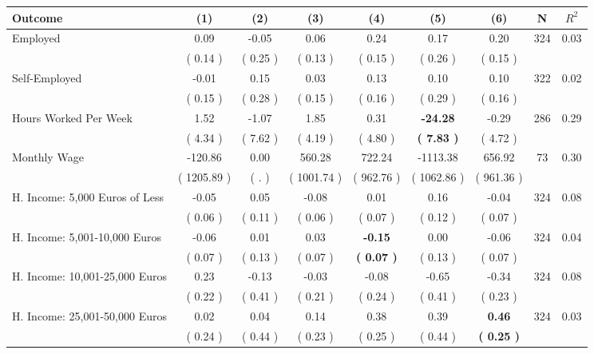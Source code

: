 \begin{tabular}{lcccccccc}
\toprule
 \textbf{Outcome} & \textbf{(1)} & \textbf{(2)} & \textbf{(3)} & \textbf{(4)} & \textbf{(5)} & \textbf{(6)} & \textbf{N} & \textbf{$ R^2$} \\
\midrule
Employed &      0.09 &     -0.05 &      0.06 &      0.24 &      0.17 &      0.20 & 324 &       0.03 \\ 
 & (     0.14 ) & (     0.25 ) & (     0.13 ) & (     0.15 ) & (     0.26 ) & (     0.15 ) & \\
Self-Employed &     -0.01 &      0.15 &      0.03 &      0.13 &      0.10 &      0.10 & 322 &       0.02 \\ 
 & (     0.15 ) & (     0.28 ) & (     0.15 ) & (     0.16 ) & (     0.29 ) & (     0.16 ) & \\
Hours Worked Per Week &      1.52 &     -1.07 &      1.85 &      0.31 & \textbf{   -24.28} &     -0.29 & 286 &       0.29 \\ 
 & (     4.34 ) & (     7.62 ) & (     4.19 ) & (     4.80 ) & \textbf{(     7.83 )} & (     4.72 ) & \\
Monthly Wage &   -120.86 &      0.00 &    560.28 &    722.24 &  -1113.38 &    656.92 & 73 &       0.30 \\ 
 & (  1205.89 ) & (        . ) & (  1001.74 ) & (   962.76 ) & (  1062.86 ) & (   961.36 ) & \\
H. Income: 5,000 Euros of Less &     -0.05 &      0.05 &     -0.08 &      0.01 &      0.16 &     -0.04 & 324 &       0.08 \\ 
 & (     0.06 ) & (     0.11 ) & (     0.06 ) & (     0.07 ) & (     0.12 ) & (     0.07 ) & \\
H. Income: 5,001-10,000 Euros &     -0.06 &      0.01 &      0.03 & \textbf{    -0.15} &      0.00 &     -0.06 & 324 &       0.04 \\ 
 & (     0.07 ) & (     0.13 ) & (     0.07 ) & \textbf{(     0.07 )} & (     0.13 ) & (     0.07 ) & \\
H. Income: 10,001-25,000 Euros &      0.23 &     -0.13 &     -0.03 &     -0.08 &     -0.65 &     -0.34 & 324 &       0.08 \\ 
 & (     0.22 ) & (     0.41 ) & (     0.21 ) & (     0.24 ) & (     0.41 ) & (     0.23 ) & \\
H. Income: 25,001-50,000 Euros &      0.02 &      0.04 &      0.14 &      0.38 &      0.39 & \textbf{     0.46} & 324 &       0.03 \\ 
 & (     0.24 ) & (     0.44 ) & (     0.23 ) & (     0.25 ) & (     0.44 ) & \textbf{(     0.25 )} & \\

\end{tabular}
